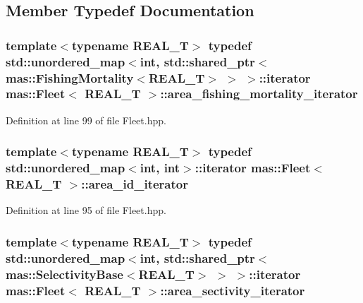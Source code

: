 \subsection{Member Typedef Documentation}
\hypertarget{structmas_1_1_fleet_a72800f7ad0b8ec91f129bd8020c19912}{
\subsubsection[{area\-\_\-fishing\-\_\-mortality\-\_\-iterator}]{\setlength{\rightskip}{0pt plus 5cm}template$<$typename R\-E\-A\-L\-\_\-\-T$>$ typedef std\-::unordered\-\_\-map$<$int, std\-::shared\-\_\-ptr$<${\bf mas\-::\-Fishing\-Mortality}$<$R\-E\-A\-L\-\_\-\-T$>$ $>$ $>$\-::iterator {\bf mas\-::\-Fleet}$<$ R\-E\-A\-L\-\_\-\-T $>$\-::{\bf area\-\_\-fishing\-\_\-mortality\-\_\-iterator}}}\label{structmas_1_1_fleet_a72800f7ad0b8ec91f129bd8020c19912}


Definition at line 99 of file Fleet.\-hpp.

\hypertarget{structmas_1_1_fleet_ac0ff17aa69ffb817ba0d36aa19b42277}{
\subsubsection[{area\-\_\-id\-\_\-iterator}]{\setlength{\rightskip}{0pt plus 5cm}template$<$typename R\-E\-A\-L\-\_\-\-T$>$ typedef std\-::unordered\-\_\-map$<$int, int$>$\-::iterator {\bf mas\-::\-Fleet}$<$ R\-E\-A\-L\-\_\-\-T $>$\-::{\bf area\-\_\-id\-\_\-iterator}}}\label{structmas_1_1_fleet_ac0ff17aa69ffb817ba0d36aa19b42277}


Definition at line 95 of file Fleet.\-hpp.

\hypertarget{structmas_1_1_fleet_a7754c30a6a70e4bac646b59fb93db23e}{
\subsubsection[{area\-\_\-sectivity\-\_\-iterator}]{\setlength{\rightskip}{0pt plus 5cm}template$<$typename R\-E\-A\-L\-\_\-\-T$>$ typedef std\-::unordered\-\_\-map$<$int, std\-::shared\-\_\-ptr$<${\bf mas\-::\-Selectivity\-Base}$<$R\-E\-A\-L\-\_\-\-T$>$ $>$ $>$\-::iterator {\bf mas\-::\-Fleet}$<$ R\-E\-A\-L\-\_\-\-T $>$\-::{\bf area\-\_\-sectivity\-\_\-iterator}}}\label{structmas_1_1_fleet_a7754c30a6a70e4bac646b59fb93db23e}


